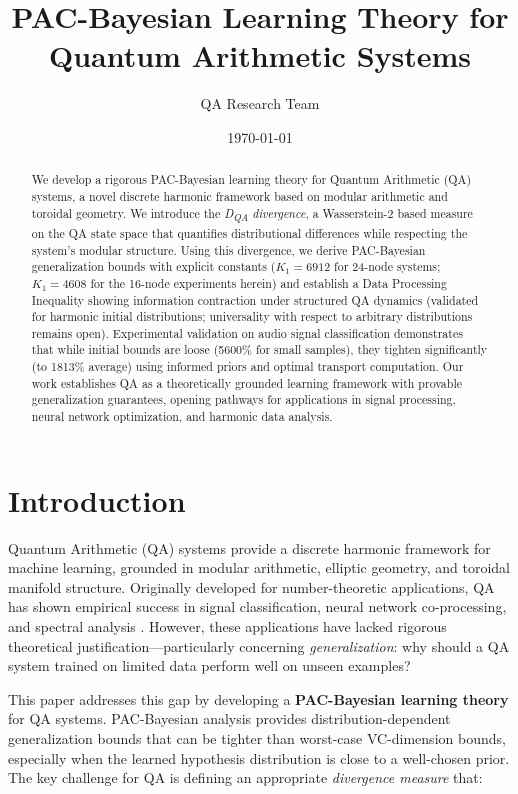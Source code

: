 \documentclass[11pt]{article}
\title{PAC-Bayesian Learning Theory for Quantum Arithmetic Systems}
\author{QA Research Team}
\date{\today}
\theoremstyle{remark}
\begin{document}
\maketitle

\begin{abstract}
We develop a rigorous PAC-Bayesian learning theory for Quantum Arithmetic (QA) systems, a novel discrete harmonic framework based on modular arithmetic and toroidal geometry. We introduce the \emph{D\textsubscript{QA} divergence}, a Wasserstein-2 based measure on the QA state space that quantifies distributional differences while respecting the system's modular structure. Using this divergence, we derive PAC-Bayesian generalization bounds with explicit constants ($K_1 = 6912$ for 24-node systems; $K_1 = 4608$ for the 16-node experiments herein) and establish a Data Processing Inequality showing information contraction under structured QA dynamics (validated for harmonic initial distributions; universality with respect to arbitrary distributions remains open). Experimental validation on audio signal classification demonstrates that while initial bounds are loose (5600\% for small samples), they tighten significantly (to 1813\% average) using informed priors and optimal transport computation. Our work establishes QA as a theoretically grounded learning framework with provable generalization guarantees, opening pathways for applications in signal processing, neural network optimization, and harmonic data analysis.
\end{abstract}

\section{Introduction}

Quantum Arithmetic (QA) systems provide a discrete harmonic framework for machine learning, grounded in modular arithmetic, elliptic geometry, and toroidal manifold structure. Originally developed for number-theoretic applications, QA has shown empirical success in signal classification, neural network co-processing, and spectral analysis \cite{qa_foundations}. However, these applications have lacked rigorous theoretical justification—particularly concerning \emph{generalization}: why should a QA system trained on limited data perform well on unseen examples?

This paper addresses this gap by developing a \textbf{PAC-Bayesian learning theory} for QA systems. PAC-Bayesian analysis \cite{mcallester1999pac, catoni2007pac} provides distribution-dependent generalization bounds that can be tighter than worst-case VC-dimension bounds, especially when the learned hypothesis distribution is close to a well-chosen prior. The key challenge for QA is defining an appropriate \emph{divergence measure} that:
\end{document}
